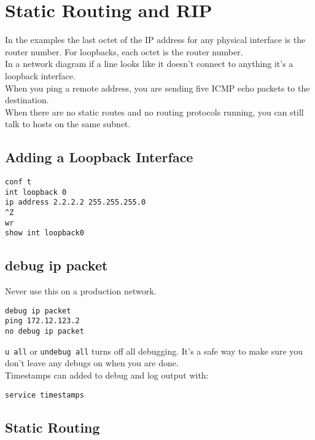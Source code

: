 \section{Static Routing and RIP}

In the examples the last octet of the IP address for any physical interface
is the router number. For loopbacks, each octet is the router number.\\

In a network diagram if a line looks like it doesn't connect to anything
it's a loopback interface.\\

When you ping a remote address, you are sending five ICMP echo packets to
the destination.\\

When there are no static routes and no routing protocols running, you can
still talk to hosts on the same subnet.

\subsection{Adding a Loopback Interface}

\begin{verbatim}
conf t
int loopback 0
ip address 2.2.2.2 255.255.255.0
^Z
wr
show int loopback0
\end{verbatim}

\subsection{debug ip packet}

Never use this on a production network.

\begin{verbatim}
debug ip packet
ping 172.12.123.2
no debug ip packet
\end{verbatim}

\texttt{u all} or \texttt{undebug all} turns off all debugging. It's a safe
way to make sure you don't leave any debugs on when you are done.\\

Timestamps can added to debug and log output with:

\begin{verbatim}
service timestamps  
\end{verbatim}

\subsection{Static Routing}

